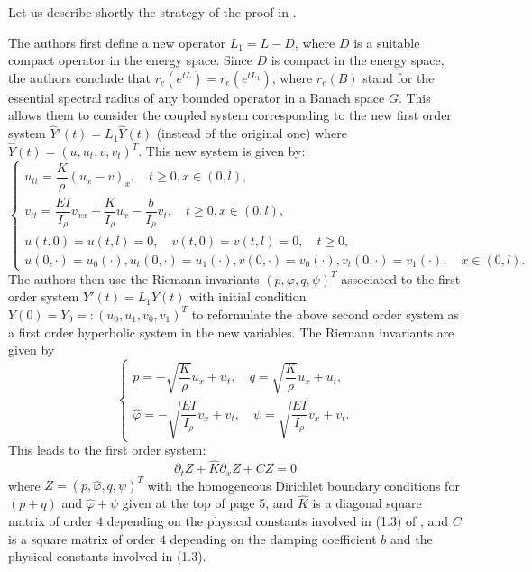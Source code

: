 \documentclass[10pt, english]{article}
\begin{document}
{Let us describe shortly the strategy of the proof in \cite{SW2003}.

The authors first define a new operator $L_1=L-D$, where  $D$ is a suitable compact operator in the energy space. Since $D$ is compact in the energy space, the authors conclude that $r_e(e^{tL})=r_e(e^{tL_1})$, where $r_e(B)$ stand for the essential spectral radius of any bounded operator in a Banach space $G$. This allows them to consider the coupled system corresponding to the new first order system $\widehat{Y}'(t)=L_1\widehat{Y}(t)$ (instead of the original one)
where $\widehat{Y}(t)=(u,u_t,v,v_t)^T$. This new system is given by:
\begin{equation}\label{C3.1}%
\begin{cases}
u_{tt}=\dfrac{K}{\rho}(u_{x}-v)_{x},  \quad t\geqslant 0, x \in (0,l), \\[1em]
v_{tt}=\dfrac{EI}{I_{\rho }}v_{xx}+\dfrac{K}{I_{\rho }}u_{x}-\dfrac{b}{I_{\rho }}v_{t}, \quad t\geqslant 0, x \in (0,l), \\
u(t,0)=u(t,l)=0,\quad v(t,0)=v(t,l)=0, \quad t \geqslant 0,\\
u(0,\cdot)=u_0(\cdot),u_t(0,\cdot)=u_1(\cdot), v(0,\cdot)=v_0(\cdot),v_t(0,\cdot)=v_1(\cdot), \quad x \in (0,l).
\end{cases} 
\end{equation}
The authors then use the Riemann invariants $(p,\varphi, q, \psi)^T$ associated to the first order system $Y'(t)=L_1Y(t)$ with initial condition $Y(0)=Y_0=:(u_0,u_1,v_0,v_1)^T$ to reformulate the above second order system as a first order hyperbolic system in the new variables.
The Riemann invariants are given by
\begin{equation}\label{C3.2}%
\begin{cases}
p=-\sqrt{\dfrac{K}{\rho}}u_x + u_t, \quad q= \sqrt{\dfrac{K}{\rho}}u_x + u_t,\\
\hat{\varphi}=-\sqrt{\dfrac{EI}{I_{\rho}}}v_x + v_t, \quad \psi= \sqrt{\dfrac{EI}{I_{\rho}}}v_x + v_t.
\end{cases} 
\end{equation}
This leads to the first order system:
\begin{equation}
\partial_tZ + \hat{K}\partial_xZ +C Z=0
\end{equation}
where $Z=(p, \hat{\varphi}, q, \psi)^T$ with the homogeneous Dirichlet boundary conditions for $(p+q)$ and $\hat{\varphi} + \psi$ given at the top of page 5, and $\hat{K}$ is a diagonal square matrix of order $4$ depending on the physical constants involved in (1.3) of \cite{SW2003}, and $C$ is a square matrix of order $4$ depending on the damping coefficient $b$ and the physical constants involved in (1.3). 

}
\end{document}
